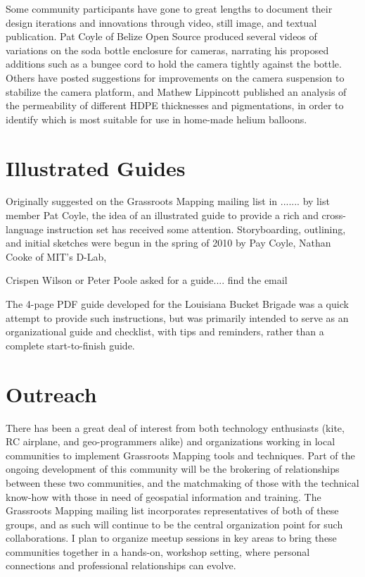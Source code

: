 \documentclass[11pt]{report}
\begin{document}
Some community participants have gone to great lengths to document their design iterations and innovations through video, still image, and textual publication. Pat Coyle of Belize Open Source produced several videos of variations on the soda bottle enclosure for cameras, narrating his proposed additions such as a bungee cord to hold the camera tightly against the bottle. Others have posted suggestions for improvements on the camera suspension to stabilize the camera platform, and Mathew Lippincott published an analysis of the permeability of different HDPE thicknesses and pigmentations, in order to identify which is most suitable for use in home-made helium balloons.




\section{Illustrated Guides}

Originally suggested on the Grassroots Mapping mailing list in ....... by list member Pat Coyle, the idea of an illustrated guide to provide a rich and cross-language instruction set has received some attention. Storyboarding, outlining, and initial sketches were begun in the spring of 2010 by Pay Coyle, Nathan Cooke of MIT's D-Lab, 

Crispen Wilson or Peter Poole asked for a guide.... find the email

The 4-page PDF guide developed for the Louisiana Bucket Brigade was a quick attempt to provide such instructions, but was primarily intended to serve as an organizational guide and checklist, with tips and reminders, rather than a complete start-to-finish guide. 

\section{Outreach}

There has been a great deal of interest from both technology enthusiasts (kite, RC airplane, and geo-programmers alike) and organizations working in local communities to implement Grassroots Mapping tools and techniques. Part of the ongoing development of this community will be the brokering of relationships between these two communities, and the matchmaking of those with the technical know-how with those in need of geospatial information and training. The Grassroots Mapping mailing list incorporates representatives of both of these groups, and as such will continue to be the central organization point for such collaborations. I plan to organize meetup sessions in key areas to bring these communities together in a hands-on, workshop setting, where personal connections and professional relationships can evolve.
\end{document}
